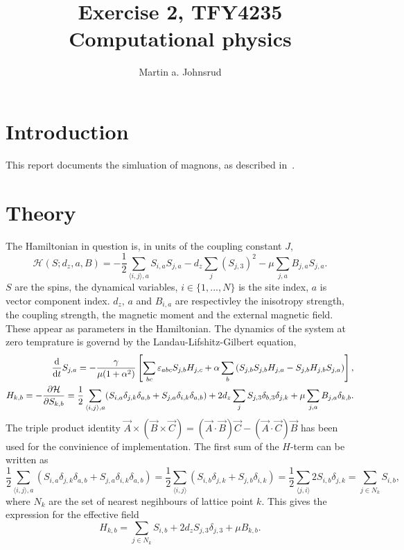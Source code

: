 \documentclass{article}
\title{Exercise 2, TFY4235 Computational physics}
\author{Martin a. Johnsrud}
\date{}
\begin{document}
    \maketitle
    \section*{Introduction}
    This report documents the simluation of magnons, as described in~\cite{exercise}.

    \section*{Theory}
    The Hamiltonian in question is, in units of the coupling constant $J$, 
    \begin{equation*}
        \mathcal{H}(S; d_z, a, B) = -\frac{1}{2} \sum_{\langle i, j \rangle, a} S_{i, a} S_{j, a} - d_z \sum_{j} (S_{j,3})^2 - \mu \sum_{j, a} B_{j, a} S_{j,a}.
    \end{equation*}
    $S$ are the spins, the dynamical variables, $i\in\{1, ..., N\}$ is the site index, $a$ is vector component index. $d_z, \, a$ and $B_{i, a}$ are respectivley the inisotropy strength, the coupling strength, the magnetic moment and the external magnetic field. These appear as parameters in the Hamiltonian. The dynamics of the system at zero temprature is governd by the Landau-Lifshitz-Gilbert equation,
    \begin{align*}
        \dv{t} S_{j, a} = - \frac{\gamma}{\mu(1 + \alpha^2)}\left[\sum_{b c}\varepsilon_{abc}S_{j, b}H_{j,c} + \alpha \sum_{b}\left(S_{j, b}S_{j, b}H_{j, a} - S_{j, b}H_{j, b}S_{j, a}\right)\right], \\
        H_{k, b} = - \pdv{\mathcal{H}}{S_{k, b}} = \frac{1}{2}\sum_{\langle i, j \rangle, a} (S_{i, a}\delta_{j,k}\delta_{a, b} + S_{j, a}\delta_{i,k}\delta_{a, b}) + 2 d_z \sum_{j} S_{j,3} \delta_{b, 3}\delta_{j, k} + \mu \sum_{j, a} B_{j, a} \delta_{k,b}.
    \end{align*}
    The triple product identity $\vec A \times (\vec B \times \vec C) = (\vec A \cdot \vec B) \vec C - (\vec A \cdot \vec C) \vec B$ has been used for the convinience of implementation. The first sum of the $H$-term can be written as
    \begin{equation*}
        \frac{1}{2}\sum_{\langle i, j \rangle, a} (S_{i, a}\delta_{j,k}\delta_{a, b} + S_{j, a}\delta_{i,k}\delta_{a, b}) = \frac{1}{2}\sum_{\langle i, j \rangle} (S_{i, b}\delta_{j,k} + S_{j, b}\delta_{i,k}) = \frac{1}{2}\sum_{\langle j, i \rangle} 2S_{i, b} \delta_{j, k} = \sum_{j \in N_k} S_{i, b},
    \end{equation*}
    where $N_k$ are the set of nearest negihbours of lattice point $k$. This gives the expression for the effective field
    \begin{equation*}
        H_{k, b} = \sum_{j \in N_k} S_{i, b} + 2d_z S_{j, 3} \delta_{j, 3} + \mu B_{k, b}.
    \end{equation*}
    
    
\end{document}
